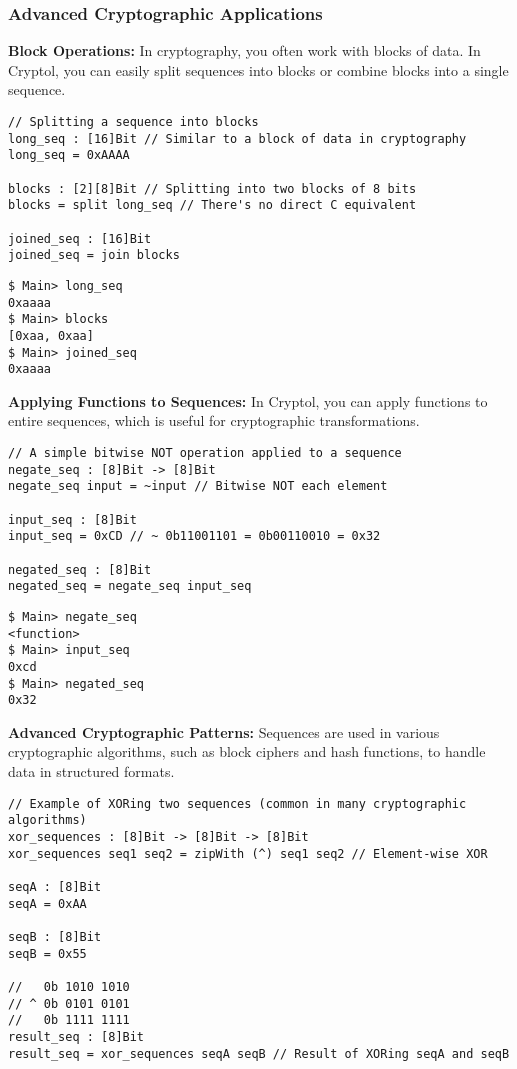 \newpage
\subsubsection{Advanced Cryptographic Applications}
\textbf{Block Operations:} In cryptography, you often work with blocks of data. In Cryptol, you can easily split sequences into blocks or combine blocks into a single sequence.
\begin{lstlisting}[style=cryptol]
// Splitting a sequence into blocks
long_seq : [16]Bit // Similar to a block of data in cryptography
long_seq = 0xAAAA

blocks : [2][8]Bit // Splitting into two blocks of 8 bits
blocks = split long_seq // There's no direct C equivalent

joined_seq : [16]Bit
joined_seq = join blocks
\end{lstlisting}
\begin{lstlisting}[style=zsh]
$ Main> long_seq
0xaaaa
$ Main> blocks
[0xaa, 0xaa]
$ Main> joined_seq
0xaaaa
\end{lstlisting}
\vspace{16pt}
\textbf{Applying Functions to Sequences:} In Cryptol, you can apply functions to entire sequences, which is useful for cryptographic transformations.
\begin{lstlisting}[style=cryptol]
// A simple bitwise NOT operation applied to a sequence
negate_seq : [8]Bit -> [8]Bit
negate_seq input = ~input // Bitwise NOT each element

input_seq : [8]Bit
input_seq = 0xCD // ~ 0b11001101 = 0b00110010 = 0x32

negated_seq : [8]Bit
negated_seq = negate_seq input_seq
\end{lstlisting}
\begin{lstlisting}[style=zsh]
$ Main> negate_seq
<function>
$ Main> input_seq
0xcd
$ Main> negated_seq
0x32
\end{lstlisting}
\vspace{16pt}
\newpage
\noindent\textbf{Advanced Cryptographic Patterns:} Sequences are used in various cryptographic algorithms, such as block ciphers and hash functions, to handle data in structured formats.
\begin{lstlisting}[style=cryptol]
// Example of XORing two sequences (common in many cryptographic algorithms)
xor_sequences : [8]Bit -> [8]Bit -> [8]Bit
xor_sequences seq1 seq2 = zipWith (^) seq1 seq2 // Element-wise XOR

seqA : [8]Bit
seqA = 0xAA

seqB : [8]Bit
seqB = 0x55

//   0b 1010 1010
// ^ 0b 0101 0101
//   0b 1111 1111
result_seq : [8]Bit
result_seq = xor_sequences seqA seqB // Result of XORing seqA and seqB
\end{lstlisting}
